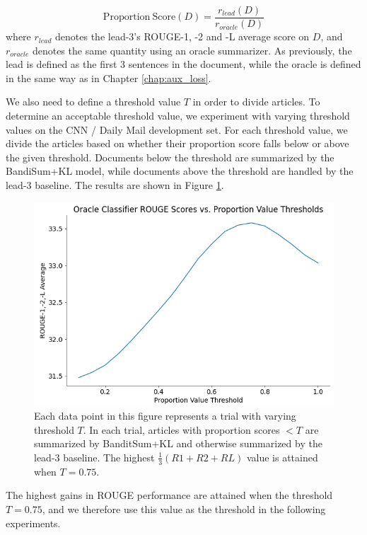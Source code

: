 \begin{equation}
\mathrm{Proportion\ Score}(D) = \frac{r_{lead}(D)}{r_{oracle}(D)}
\end{equation}
where $r_{lead}$ denotes the lead-3's ROUGE-1, -2 and -L average score on $D$, and $r_{oracle}$ denotes the same quantity using an oracle summarizer.
As previously, the lead is defined as the first 3 sentences in the document, while the oracle is defined in the same way as in Chapter \ref{chap:aux_loss}.

We also need to define a threshold value $T$ in order to divide articles. To determine an acceptable threshold value, we experiment with varying threshold values on the CNN / Daily Mail development set. For each threshold value, we divide the articles based on whether their proportion score falls below or above the given threshold. Documents below the threshold are summarized by the BandiSum+KL model, while documents above the threshold are handled by the lead-3 baseline. The results are shown in Figure \ref{fig:prop_value_thresh}.

\begin{figure}[h]
    \centering
    \includegraphics[width=0.75\linewidth]{fig/proportion_value_thresholds.png}
    \caption[ROUGE performance with varying proportion score thresholds.]{Each data point in this figure represents a trial with varying threshold $T$. In each trial, articles with proportion scores $<T$ are summarized by BanditSum+KL and otherwise summarized by the lead-3 baseline. The highest $\frac{1}{3}(R1+R2+RL)$ value is attained when $T = 0.75$.}
    \label{fig:prop_value_thresh}
\end{figure}

The highest gains in ROUGE performance are attained when the threshold $T = 0.75$, and we therefore use this value as the threshold in the following experiments.

